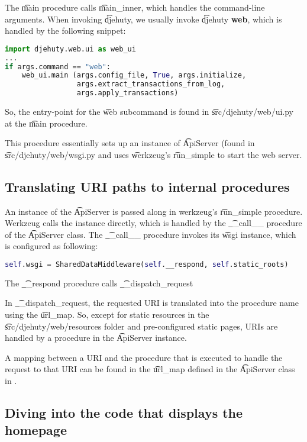 The \t{main} procedure calls \t{main\_inner}, which handles the command-line
arguments.  When invoking \t{djehuty}, we usually invoke
\t{djehuty \textbf{web}}, which is handled by the following snippet:
\begin{lstlisting}[language=python]
import djehuty.web.ui as web_ui
...
if args.command == "web":
    web_ui.main (args.config_file, True, args.initialize,
                 args.extract_transactions_from_log,
                 args.apply_transactions)
\end{lstlisting}

So, the entry-point for the \t{web} subcommand is found in
\t{src/djehuty/web/ui.py} at the \t{main} procedure.

This procedure essentially sets up an instance of \t{ApiServer} (found in
\t{src/djehuty/web/wsgi.py} and uses \t{werkzeug}'s \t{run\_simple} to start
the web server.

\subsection{Translating URI paths to internal procedures}

An instance of the \t{ApiServer} is passed along in werkzeug's \t{run\_simple}
procedure.  Werkzeug calls the instance directly, which is handled by the
\t{\_\_call\_\_} procedure of the \t{ApiServer} class.  The \t{\_\_call\_\_} procedure
invokes its \t{wsgi} instance, which is configured as following:
\begin{lstlisting}[language=python]
self.wsgi = SharedDataMiddleware(self.__respond, self.static_roots)
\end{lstlisting}

The \t{\_\_respond} procedure calls \t{\_\_dispatch\_request}

In \t{\_\_dispatch\_request}, the requested URI is translated into the procedure
name using the \t{url\_map}.  So, except for static resources in the
\t{src/djehuty/web/resources} folder and pre-configured static pages, URIs are
handled by a procedure in the \t{ApiServer} instance.

A mapping between a URI and the procedure that is executed to handle the
request to that URI can be found in the \t{url\_map} defined in the
\t{ApiServer} class in .

\subsection{Diving into the code that displays the homepage}

